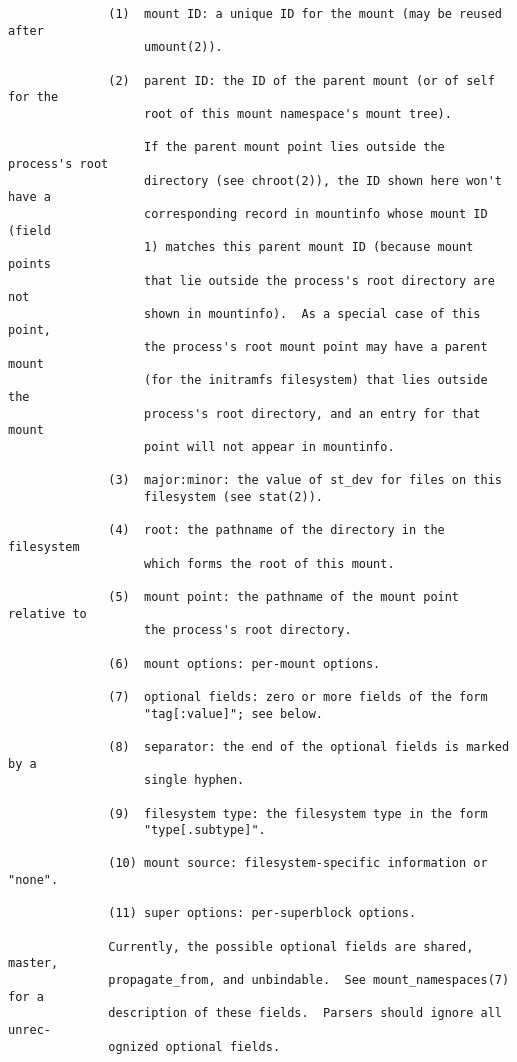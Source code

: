 \documentclass[]{article}
\begin{document}
\begin{verbatim}
              (1)  mount ID: a unique ID for the mount (may be reused after
                   umount(2)).

              (2)  parent ID: the ID of the parent mount (or of self for the
                   root of this mount namespace's mount tree).

                   If the parent mount point lies outside the process's root
                   directory (see chroot(2)), the ID shown here won't have a
                   corresponding record in mountinfo whose mount ID (field
                   1) matches this parent mount ID (because mount points
                   that lie outside the process's root directory are not
                   shown in mountinfo).  As a special case of this point,
                   the process's root mount point may have a parent mount
                   (for the initramfs filesystem) that lies outside the
                   process's root directory, and an entry for that mount
                   point will not appear in mountinfo.

              (3)  major:minor: the value of st_dev for files on this
                   filesystem (see stat(2)).

              (4)  root: the pathname of the directory in the filesystem
                   which forms the root of this mount.

              (5)  mount point: the pathname of the mount point relative to
                   the process's root directory.

              (6)  mount options: per-mount options.

              (7)  optional fields: zero or more fields of the form
                   "tag[:value]"; see below.

              (8)  separator: the end of the optional fields is marked by a
                   single hyphen.

              (9)  filesystem type: the filesystem type in the form
                   "type[.subtype]".

              (10) mount source: filesystem-specific information or "none".

              (11) super options: per-superblock options.

              Currently, the possible optional fields are shared, master,
              propagate_from, and unbindable.  See mount_namespaces(7) for a
              description of these fields.  Parsers should ignore all unrec‐
              ognized optional fields.


\end{verbatim}
\end{document}
